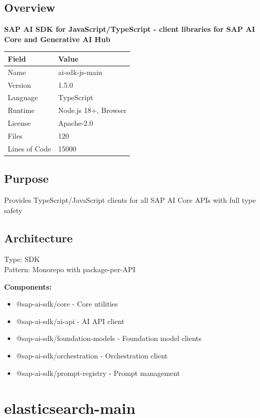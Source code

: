 \documentclass[11pt,a4paper]{article}
\begin{document}
\subsection{Overview}

\textbf{SAP AI SDK for JavaScript/TypeScript - client libraries for SAP AI Core and Generative AI Hub}

\begin{tabular}{@{}ll@{}}
\toprule
\textbf{Field} & \textbf{Value} \\
\midrule
Name & ai-sdk-js-main \\
Version & 1.5.0 \\
Language & TypeScript \\
Runtime & Node.js 18+, Browser \\
License & Apache-2.0 \\
Files & 120 \\
Lines of Code & 15000 \\
\bottomrule
\end{tabular}

\subsection{Purpose}
Provides TypeScript/JavaScript clients for all SAP AI Core APIs with full type safety

\subsection{Architecture}
Type: SDK \\
Pattern: Monorepo with package-per-API

\textbf{Components:}\begin{itemize}[noitemsep]
\item @sap-ai-sdk/core - Core utilities
\item @sap-ai-sdk/ai-api - AI API client
\item @sap-ai-sdk/foundation-models - Foundation model clients
\item @sap-ai-sdk/orchestration - Orchestration client
\item @sap-ai-sdk/prompt-registry - Prompt management
\end{itemize}

\newpage


\section{elasticsearch-main}
\end{document}
